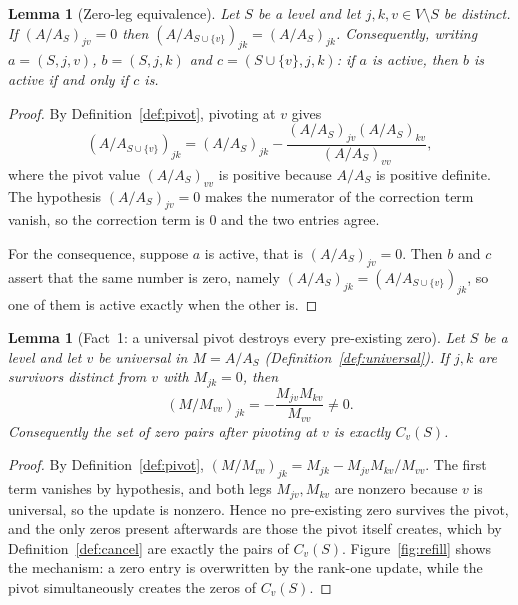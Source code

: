 \documentclass[11pt]{article}
\theoremstyle{plain}
\newtheorem{lemma}[theorem]{Lemma}
\theoremstyle{definition}
\begin{document}
\begin{humanblock}
\begin{lemma}[Zero-leg equivalence]\label{lem:zeroleg}
Let $S$ be a level and let $j,k,v\in V\setminus S$ be distinct. If $(A/A_S)_{jv}=0$ then
$(A/A_{S\cup\{v\}})_{jk}=(A/A_S)_{jk}$. Consequently, writing $a=(S,j,v)$, $b=(S,j,k)$ and
$c=(S\cup\{v\},j,k)$: if $a$ is active, then $b$ is active if and only if $c$ is.
\end{lemma}

\begin{proof}
By Definition~\ref{def:pivot}, pivoting at $v$ gives
\[
  (A/A_{S\cup\{v\}})_{jk}=(A/A_S)_{jk}-\frac{(A/A_S)_{jv}(A/A_S)_{kv}}{(A/A_S)_{vv}},
\]
where the pivot value $(A/A_S)_{vv}$ is positive because $A/A_S$ is positive definite. The hypothesis
$(A/A_S)_{jv}=0$ makes the numerator of the correction term vanish, so the correction term is $0$ and
the two entries agree.

For the consequence, suppose $a$ is active, that is $(A/A_S)_{jv}=0$. Then $b$ and $c$ assert that the
same number is zero, namely $(A/A_S)_{jk}=(A/A_{S\cup\{v\}})_{jk}$, so one of them is active exactly
when the other is.
\end{proof}

\begin{lemma}[Fact~1: a universal pivot destroys every pre-existing zero]\label{lem:fact1}
Let $S$ be a level and let $v$ be universal in $M=A/A_S$ (Definition~\ref{def:universal}). If $j,k$
are survivors distinct from $v$ with $M_{jk}=0$, then
\[(M/M_{vv})_{jk}=-\frac{M_{jv}M_{kv}}{M_{vv}}\neq0.\]
Consequently the set of zero pairs after pivoting at $v$ is exactly $C_v(S)$.
\end{lemma}

\begin{proof}
By Definition~\ref{def:pivot}, $(M/M_{vv})_{jk}=M_{jk}-M_{jv}M_{kv}/M_{vv}$. The first term vanishes
by hypothesis, and both legs $M_{jv},M_{kv}$ are nonzero because $v$ is universal, so the update is
nonzero. Hence no pre-existing zero survives the pivot, and the only zeros present afterwards are
those the pivot itself creates, which by Definition~\ref{def:cancel} are exactly the pairs of
$C_v(S)$. Figure~\ref{fig:refill} shows the mechanism: a zero entry is overwritten by the rank-one
update, while the pivot simultaneously creates the zeros of $C_v(S)$.
\end{proof}
\end{humanblock}
\end{document}

